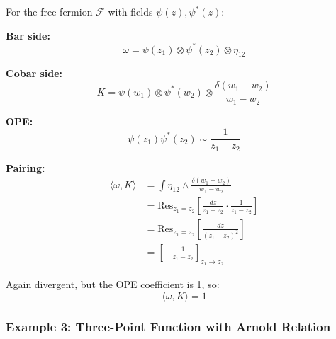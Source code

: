 \begin{example}\label{ex:fermion-pairing}
For the free fermion $\mathcal{F}$ with fields $\psi(z), \psi^*(z)$:

\textbf{Bar side:}
$$\omega = \psi(z_1) \otimes \psi^*(z_2) \otimes \eta_{12}$$

\textbf{Cobar side:}
$$K = \psi(w_1) \otimes \psi^*(w_2) \otimes \frac{\delta(w_1 - w_2)}{w_1 - w_2}$$

\textbf{OPE:}
$$\psi(z_1)\psi^*(z_2) \sim \frac{1}{z_1 - z_2}$$

\textbf{Pairing:}
\begin{align*}
\langle \omega, K \rangle &= \int \eta_{12} \wedge \frac{\delta(w_1 - w_2)}{w_1 - w_2}\\
&= \text{Res}_{z_1 = z_2}\left[\frac{dz}{z_1 - z_2} \cdot \frac{1}{z_1 - z_2}\right]\\
&= \text{Res}_{z_1 = z_2}\left[\frac{dz}{(z_1 - z_2)^2}\right]\\
&= \left[-\frac{1}{z_1 - z_2}\right]_{z_1 \to z_2}
\end{align*}

Again divergent, but the OPE coefficient is 1, so:
$$\langle \omega, K \rangle = 1$$
\checkmark
\end{example}

\subsubsection{Example 3: Three-Point Function with Arnold Relation}


